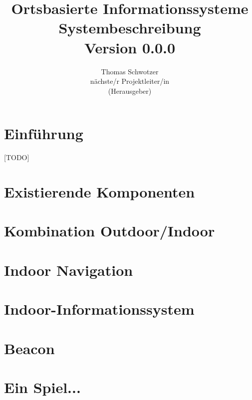 \documentclass[german]{book}
\begin{document}
\title{Ortsbasierte Informationssysteme\\
Systembeschreibung \\
Version 0.0.0
}

\author{Thomas Schwotzer \\
nächste/r Projektleiter/in\\
(Herausgeber)
}

\maketitle

\tableofcontents

\chapter{Einführung}
[TODO]

\chapter{Existierende Komponenten}

\chapter{Kombination Outdoor/Indoor}


\chapter{Indoor Navigation}
%

\chapter{Indoor-Informationssystem}
%

\chapter{Beacon}


\chapter{Ein Spiel...}




\end{document}
